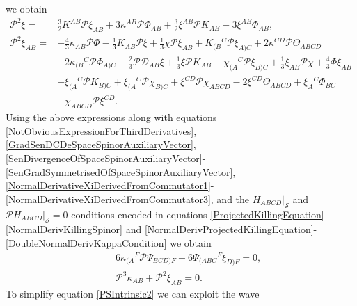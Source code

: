 \documentclass[10pt,a4paper]{article}
\theoremstyle{plain}
\begin{document}
we obtain
\begin{align}
\mathcal{P}^{2}\xi
=&\tfrac{3}{2}K^{AB}\mathcal{P}\xi_{AB}+3\kappa^{AB}\mathcal{P}\Phi_{AB}
+
\tfrac{3}{2}\xi^{AB}\mathcal{P}K_{AB}-3\xi^{AB}\Phi_{AB}, \label{SecondNormalDerivativeXi}
\\ \mathcal{P}^{2}\xi_{AB} =&
-\tfrac{4}{3}\kappa_{AB}\mathcal{P}\Phi-\tfrac{1}{3}K_{AB}\mathcal{P}\xi
+\tfrac{1}{3}\chi\mathcal{P}\xi_{AB}+K_{(B}{}^{C}\mathcal{P}\xi_{A)C}+2\kappa^{CD}\mathcal{P}\Theta_{ABCD}
\nonumber \\ & -2\kappa_{(B}{}^{C}\mathcal{P}\Phi_{A)C}
-\tfrac{2}{3}\mathcal{P}\mathcal{D}_{AB}\xi +
\tfrac{1}{3}\xi\mathcal{P}K_{AB}
-\chi_{(A}{}^{C}\mathcal{P}\xi_{B)C}+\tfrac{1}{3}\xi_{AB}\mathcal{P}\chi
+ \tfrac{4}{3}\Phi\xi_{AB} \nonumber \\ &
-\xi_{(A}{}^{C}\mathcal{P}K_{B)C} +\xi_{(A}{}^{C}\mathcal{P}\chi_{B)C}
+\xi^{CD}\mathcal{P}\chi_{ABCD}-2\xi^{CD}\Theta_{ABCD}+\xi_{A}{}^{C}\Phi_{BC}
\nonumber \\ &
+\chi_{ABCD}\mathcal{P}\xi^{CD}. \label{SecondNormalDerivativeXiSym}
\end{align}
 Using the above expressions along with equations
 \eqref{NotObviousExpressionForThirdDerivatives},
 \eqref{GradSenDCDeSpaceSpinorAuxiliaryVector},
 \eqref{SenDivergenceOfSpaceSpinorAuxiliaryVector}-\eqref{SenGradSymmetrisedOfSpaceSpinorAuxiliaryVector},
 \eqref{NormalDerivativeXiDerivedFromCommutator1}-\eqref{NormalDerivativeXiDerivedFromCommutator3},
 and the $H_{ABCD}|_{\mathcal{S}}$ and
 $\mathcal{P}H_{ABCD}|_{\mathcal{S}}=0$ conditions encoded in
 equations
 \eqref{ProjectedKillingEquation}-\eqref{NormalDerivKillingSpinor} and
 \eqref{NormalDerivProjectedKillingEquation}-\eqref{DoubleNormalDerivKappaCondition}
 we obtain
\begin{subequations}
\begin{eqnarray}
&& 6\kappa_{(A}{}^{F}\mathcal{P}\Psi_{BCD)F} + 6\Psi_{(ABC}{}^{F}\xi_{D)F}=0,\label{PSIntrinsic1}
\\
&& \mathcal{P}^{3}\kappa_{AB}+\mathcal{P}^{2}\xi_{AB}=0.
\label{PSIntrinsic2}
\label{PSIntrinsic4}
\end{eqnarray}
\end{subequations}
To simplify equation \eqref{PSIntrinsic2} we can exploit the wave
\end{document}
